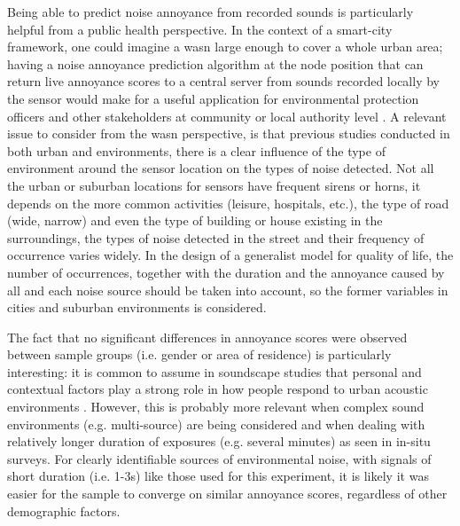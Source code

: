Being able to predict noise annoyance from recorded sounds is particularly helpful from a public health perspective. In the context of a smart-city framework, one could imagine a \gls{wasn} large enough to cover a whole urban area; having a noise annoyance prediction algorithm at the node position that can return live annoyance scores to a central server from sounds recorded locally by the sensor would make for a useful application for environmental protection officers and other stakeholders at community or local authority level . A relevant issue to consider from the \gls{wasn} perspective, is that previous studies conducted in both urban  and  environments, there is a clear influence of the type of environment around the sensor location on the types of noise detected. Not all the urban or suburban locations for sensors have frequent sirens or horns, it depends on the more common activities (leisure, hospitals, etc.), the type of road (wide, narrow) and even the type of building or house existing in the surroundings, the types of noise detected in the street and their frequency of occurrence varies widely. In the design of a generalist model for quality of life, the number of occurrences, together with the duration and the annoyance caused by all and each noise source should be taken into account, so the former variables in cities and suburban environments is considered.

The fact that no significant differences in annoyance scores were observed between sample groups (i.e. gender or area of residence) is particularly interesting: it is common to assume in soundscape studies that personal and contextual factors play a strong role in how people respond to urban acoustic environments . However, this is probably more relevant when complex sound environments (e.g. multi-source) are being considered and when dealing with relatively longer duration of exposures (e.g. several minutes) as seen in in-situ surveys. For clearly identifiable sources of environmental noise, with signals of short duration (i.e. 1-3s) like those used for this experiment, it is likely it was easier for the sample to converge on similar annoyance scores, regardless of other demographic factors.

